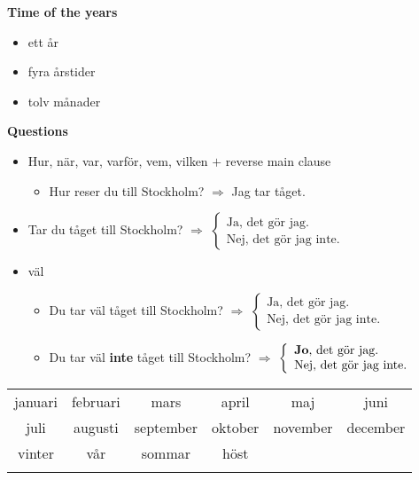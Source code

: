 
\begin{flushleft}
    \textbf{Time of the years}
    \begin{itemize}
        \item ett år
        \item fyra årstider
        \item tolv månader
    \end{itemize}

    \textbf{Questions}
    \begin{itemize}
        \item Hur, när, var, varför, vem, vilken $+$ reverse main clause
        \begin{itemize}
            \item Hur reser du till Stockholm? $\Rightarrow$ Jag tar tåget.
        \end{itemize}
        \item Tar du tåget till Stockholm? $\Rightarrow$ $\left\{
            \begin{array}{l}
                \text{Ja, det gör jag.} \\
                \text{Nej, det gör jag inte.}
            \end{array}
        \right.$
        \item väl
        \begin{itemize}
            \item Du tar väl tåget till Stockholm? $\Rightarrow$ $\left\{
                \begin{array}{l}
                    \text{Ja, det gör jag.} \\
                    \text{Nej, det gör jag inte.}
                \end{array}
            \right.$
            \item Du tar väl \textbf{inte} tåget till Stockholm? $\Rightarrow$ $\left\{
                \begin{array}{l}
                    \text{\textbf{Jo}, det gör jag.} \\
                    \text{Nej, det gör jag inte.}
                \end{array}
            \right.$
        \end{itemize}
    \end{itemize}
\end{flushleft}

\begin{center}
    \begin{tabular}{|c c c c c c|}
        \hline
        januari & februari & mars & april & maj & juni \\
        juli & augusti & september & oktober & november & december \\
        vinter & vår & sommar & höst &  &  \\
         &  &  &  &  &  \\
        \hline
    \end{tabular}
\end{center}

